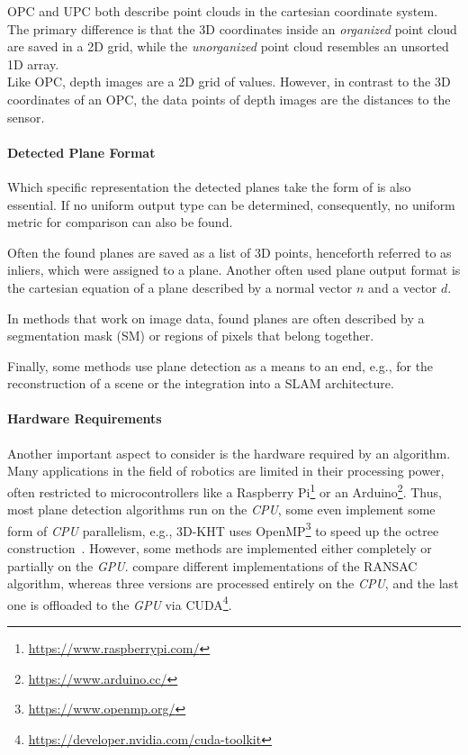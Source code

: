 \documentclass[main.tex]{subfiles}
\begin{document}
OPC and UPC both describe point clouds in the cartesian coordinate system. The primary difference is that the 3D coordinates inside
an \textit{organized} point cloud are saved in a 2D grid, while the \textit{unorganized} point cloud resembles an unsorted 1D array.\\
Like OPC, depth images are a 2D grid of values. However, in contrast to the 3D coordinates of an OPC, the data points of depth images
are the distances to the sensor.



\paragraph{Detected Plane Format} \label{subsec:planeformat}
Which specific representation the detected planes take the form of is also essential.
If no uniform output type can be determined, consequently, no uniform metric for comparison can also be found.


Often the found planes are saved as a list of 3D points, henceforth referred to as inliers, which were assigned to a plane.
Another often used plane output format is the cartesian equation of a plane described by a normal vector $n$ and a vector $d$.

In methods that work on image data, found planes are often described by a segmentation mask (SM) or regions of pixels that belong together.

Finally, some methods use plane detection as a means to an end, e.g., for the reconstruction of a scene or the integration into
a SLAM architecture.

\paragraph{Hardware Requirements}
Another important aspect to consider is the hardware required by an algorithm.
Many applications in the field of robotics are limited in their processing power, often restricted to microcontrollers like
a Raspberry Pi\footnote{\href{https://www.raspberrypi.com/}{https://www.raspberrypi.com/}} or an Arduino\footnote{\href{https://www.arduino.cc/}{https://www.arduino.cc/}}.
Thus, most plane detection algorithms run on the \textit{CPU}, some even implement some form of \textit{CPU} parallelism, e.g., 3D-KHT uses OpenMP\footnote{\href{https://www.openmp.org/}{https://www.openmp.org/}}
to speed up the octree construction~\cite[Section~4]{LimbergerOliveira2015HT3D}.
However, some methods are implemented either completely or partially on the \textit{GPU}.
\citeauthor{Hidalgo-Paniagua_Vega-Rodríguez_Pavón_Ferruz_2015}\cite{Hidalgo-Paniagua_Vega-Rodríguez_Pavón_Ferruz_2015} compare different
implementations of the RANSAC algorithm, whereas three versions are processed entirely on the \textit{CPU}, and the last one is offloaded
to the \textit{GPU} via CUDA\footnote{\href{https://developer.nvidia.com/cuda-toolkit}{https://developer.nvidia.com/cuda-toolkit}}.
\end{document}
